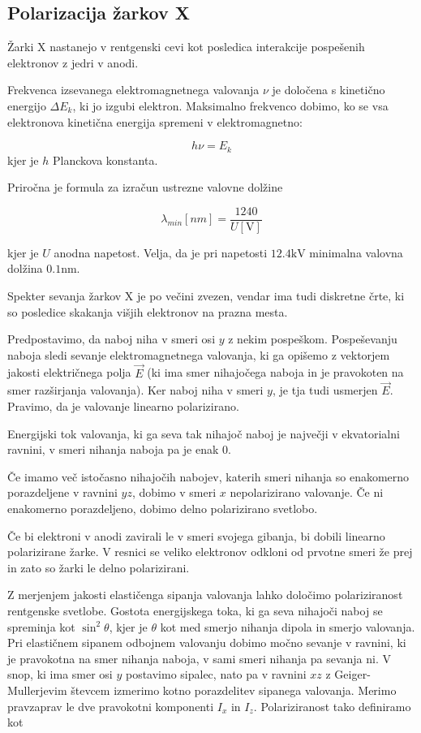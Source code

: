 \documentclass[11pt]{article}
\begin{document}
\subsection{Polarizacija žarkov X}\label{sec:org794e03d}
Žarki X nastanejo v rentgenski cevi kot posledica interakcije pospešenih elektronov z jedri v anodi.

Frekvenca izsevanega elektromagnetnega valovanja \(\nu\) je določena s kinetično energijo \(\Delta E_k\), ki jo izgubi elektron. Maksimalno frekvenco dobimo, ko se vsa elektronova kinetična energija spremeni v elektromagnetno:

\[  h \nu = E_k
\]
kjer je \(h\) Planckova konstanta. 

Priročna je formula za izračun ustrezne valovne dolžine

\[ \lambda_{min}[nm] = \frac{1240}{U[\mathrm{V}]} 
\]

kjer je \(U\) anodna napetost. Velja, da je pri napetosti \(12.4 \mathrm{kV}\) minimalna valovna dolžina \(0.1 \mathrm{nm}\).

Spekter sevanja žarkov X je po večini zvezen, vendar ima tudi diskretne črte, ki so posledice skakanja višjih elektronov na prazna mesta.

Predpostavimo, da naboj niha v smeri osi \(y\) z nekim pospeškom. Pospeševanju naboja sledi sevanje elektromagnetnega valovanja, ki ga opišemo z vektorjem jakosti električnega polja \(\vec{E}\) (ki ima smer nihajočega naboja in je pravokoten na smer razširjanja valovanja). Ker naboj niha v smeri \(y\), je tja tudi usmerjen \(\vec{E}\). Pravimo, da je valovanje linearno polarizirano.

Energijski tok valovanja, ki ga seva tak nihajoč naboj je največji v ekvatorialni ravnini, v smeri nihanja naboja pa je enak 0.

Če imamo več istočasno nihajočih nabojev, katerih smeri nihanja so enakomerno porazdeljene v ravnini \(yz\), dobimo v smeri \(x\) nepolarizirano valovanje. Če ni enakomerno porazdeljeno, dobimo delno polarizirano svetlobo.

Če bi elektroni v anodi zavirali le v smeri svojega gibanja, bi dobili linearno polarizirane žarke. V resnici se veliko elektronov odkloni od prvotne smeri že prej in zato so žarki le delno polarizirani.

Z merjenjem jakosti elastičenga sipanja valovanja lahko določimo polariziranost rentgenske svetlobe. Gostota energijskega toka, ki ga seva nihajoči naboj se spreminja kot \(\sin ^2 \theta\), kjer je \(\theta\) kot med smerjo nihanja dipola in smerjo valovanja. Pri elastičnem sipanem odbojnem valovanju dobimo močno sevanje v ravnini, ki je pravokotna na smer nihanja naboja, v sami smeri nihanja pa sevanja ni. V snop, ki ima smer osi \(y\) postavimo sipalec, nato pa v ravnini \(xz\) z Geiger-Mullerjevim števcem izmerimo kotno porazdelitev sipanega valovanja. Merimo pravzaprav le dve pravokotni komponenti \(I_x\) in \(I_z\). Polariziranost tako definiramo kot
\end{document}
